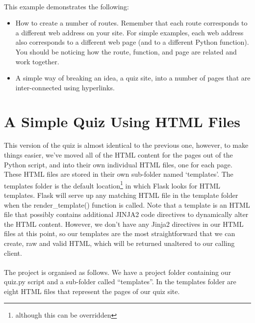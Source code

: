 

\paragraph{} This example demonstrates the following:

\begin{itemize}
\item How to create a number of routes. Remember that each route corresponds to a different web address on your site. For simple examples, each web address also corresponds to a different web page (and to a different Python function). You should be noticing how the route, function, and page are related and work together.
\item A simple way of breaking an idea, a quiz site, into a number of pages that are inter-connected using hyperlinks.
\end{itemize}


\section{A Simple Quiz Using HTML Files}
\paragraph{} This version of the quiz is almost identical to the previous one, however, to make things easier, we've moved all of the HTML content for the pages out of the Python script, and into their own individual HTML files, one for each page. These HTML files are stored in their own sub-folder named `templates'. The templates folder is the default location\footnote{although this can be overridden} in which Flask looks for HTML templates. Flask will serve up any matching HTML file in the template folder when the render\_template() function is called. Note that a template is an HTML file that possibly contains additional JINJA2 code directives to dynamically alter the HTML content. However, we don't have any Jinja2 directives in our HTML files at this point, so our templates are the most straightforward that we can create, raw and valid HTML, which will be returned unaltered to our calling client.

\paragraph{} The project is organised as follows. We have a project folder containing our quiz.py script and a sub-folder called ``templates''. In the templates folder are eight HTML files that represent the pages of our quiz site.

